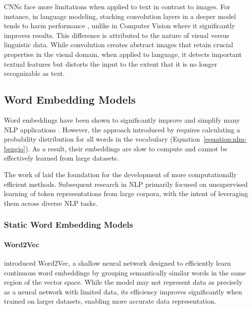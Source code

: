 \acp{CNN} face more limitations when applied to text in contrast to images. For instance, in language modeling, stacking convolution layers in a deeper model tends to harm performance \citep{pham2016convolutional}, unlike in Computer Vision where it significantly improves results. This difference is attributed to the nature of visual versus linguistic data. While convolution creates abstract images that retain crucial properties in the visual domain, when applied to language, it detects important textual features but distorts the input to the extent that it is no longer recognizable as text.

\subsection{Word Embedding Models}

Word embeddings have been shown to significantly improve and simplify many \ac{NLP} applications \citep{collobert2011natural}. However, the approach introduced by \citet{bengio2000neural} requires calculating a probability distribution for all words in the vocabulary (Equation~\ref{equation:nlm-bengio}). As a result, their embeddings are slow to compute and cannot be effectively learned from large datasets. 

The work of \citet{bengio2000neural} laid the foundation for the development of more computationally efficient methods. Subsequent research in \ac{NLP} primarily focused on unsupervised learning of token representations from large corpora, with the intent of leveraging them across diverse \ac{NLP} tasks.


\subsubsection{Static Word Embedding Models} 

\paragraph{Word2Vec}

\citet{mikolov2013efficient} introduced Word2Vec, a shallow neural network designed to efficiently learn continuous word embeddings by grouping semantically similar words in the same region of the vector space. While the model may not represent data as precisely as a neural network with limited data, its efficiency improves significantly when trained on larger datasets, enabling more accurate data representation. 

